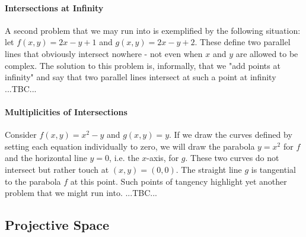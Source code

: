 
\paragraph{Intersections at Infinity}
A second problem that we may run into is exemplified by the following situation: let $f(x,y) = 2 x - y + 1$ and $g(x,y) = 2 x - y + 2$. These define two parallel lines that obviously intersect nowhere - not even when $x$ and $y$ are allowed to be complex. The solution to this problem is, informally, that we "add points at infinity" and say that two parallel lines intersect at such a point at infinity ...TBC...


\paragraph{Multiplicities of Intersections}
Consider $f(x,y) = x^2 - y$ and $g(x,y) = y$. If we draw the curves defined by setting each equation individually to zero, we will draw the parabola $y = x^2$ for $f$ and the horizontal line $y = 0$, i.e. the $x$-axis, for $g$. These two curves do not intersect but rather touch at $(x,y) = (0,0)$. The straight line $g$ is tangential to the parabola $f$ at this point. Such points of tangency highlight yet another problem that we might run into.
 ...TBC...



\subsection{Projective Space}

